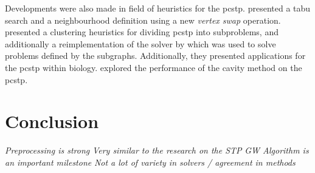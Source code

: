   Developments were also made in field of heuristics for the \gls{pcstp}. \citet{fu2014knowledge} presented a tabu search and a neighbourhood definition
  using a new \textit{vertex swap} operation.
  \citet{akhmedov2016divide} presented a clustering heuristics for dividing \gls{pcstp} into subproblems,
  and additionally a
  reimplementation of the solver by \citet{ljubic2005solving} which was used to solve problems defined by the subgraphs. Additionally, they presented
  applications for the \gls{pcstp} within biology.
  \citet{biazzo2012performance} explored the performance of the cavity method on the \gls{pcstp}.

\clearpage


\clearpage








\section{Conclusion}


\textit{Preprocessing is strong}
\textit{Very similar to the research on the STP}
\textit{GW Algorithm is an important milestone}
\textit{Not a lot of variety in solvers / agreement in methods}


